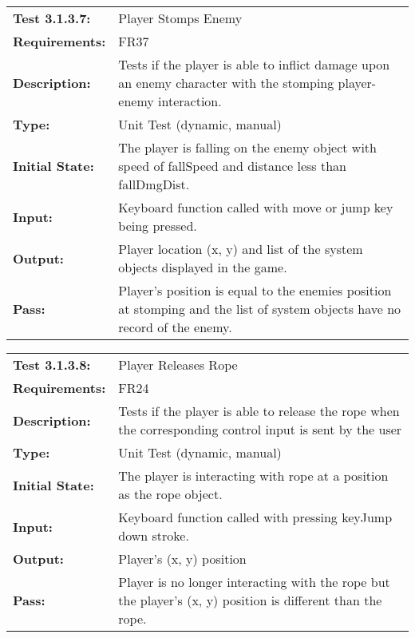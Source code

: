 \documentclass[12pt, titlepage]{article}
\begin{document}
\begin{tabular}{|l|p{10cm}|}
    \hline
    \bf{Test} 3.1.3.7: & Player Stomps Enemy\\
    \bf{Requirements}: & FR37\\
    \bf{Description}: & Tests if the player is able to inflict damage upon an enemy character with the stomping player-enemy interaction. \\
    \bf{Type}: & Unit Test (dynamic, manual) \\
    \bf{Initial State}: & The player is falling on the enemy object with speed of fallSpeed and distance less than fallDmgDist. \\
    \bf{Input}: & Keyboard function called with move or jump key being pressed. \\
    \bf{Output}: & Player location (x, y) and list of the system objects displayed in the game.\\
    \bf{Pass}: & Player's position is equal to the enemies position at stomping and the list of system objects have no record of the enemy.\\
    \hline
\end{tabular}

\begin{tabular}{|l|p{10cm}|}
    \hline
    \bf{Test} 3.1.3.8: & Player Releases Rope\\
    \bf{Requirements}: & FR24\\
    \bf{Description}: & Tests if the player is able to release the rope when the corresponding control input is sent by the user \\
    \bf{Type}: & Unit Test (dynamic, manual) \\
    \bf{Initial State}: & The player is interacting with rope at a position as the rope object.\\
    \bf{Input}: & Keyboard function called with pressing keyJump down stroke. \\
    \bf{Output}: & Player's (x, y) position\\
    \bf{Pass}: & Player is no longer interacting with the rope but the player's (x, y) position is different than the rope.\\
    \hline
\end{tabular}
\end{document}
